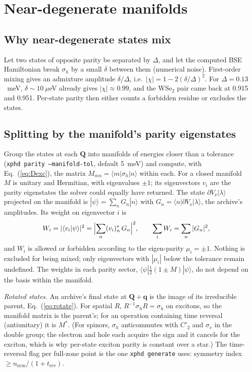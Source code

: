 \documentclass[10pt,a4paper]{article}
\newcommand{\bq}{\mathbf{q}}
\newcommand{\bQ}{\mathbf{Q}}
\begin{document}
\section{Near-degenerate manifolds}
\label{sec:manifold}

\subsection{Why near-degenerate states mix}
Let two states of opposite parity be separated by $\Delta$, and let the computed
BSE Hamiltonian break $\sigma_h$ by a small $\delta$ between them (numerical
noise). First-order mixing gives an admixture amplitude $\delta/\Delta$, i.e.\
$|\chi|=1-2(\delta/\Delta)^2$. For $\Delta=0.13$~meV, $\delta\sim10~\mu$eV
already gives $|\chi|\approx0.99$, and the WSe$_2$ pair came back at 0.915 and
0.951. Per-state parity then either counts a forbidden residue or excludes the
states.

\subsection{Splitting by the manifold's parity eigenstates}
Group the states at each $\bQ$ into manifolds of energies closer than a
tolerance (\texttt{xphd parity --manifold-tol}, default 5~meV) and compute, with
Eq.~(\ref{eq:Dexc}), the matrix $M_{mn}=\langle m|\sigma_h|n\rangle$ within each.
For a closed manifold $M$ is unitary and Hermitian, with eigenvalues $\pm1$;
its eigenvectors $v_i$ are the parity eigenstates the solver could equally have
returned. The state $\partial V_\nu|\lambda\rangle$ projected on the manifold is
$|\psi\rangle=\sum_n G_n|n\rangle$ with $G_n=\langle n|\partial V_\nu|\lambda\rangle$,
the archive's amplitudes. Its weight on eigenvector $i$ is
\begin{equation}
W_i=|\langle v_i|\psi\rangle|^2=\Bigl|\sum_n (v_i)_n^{*}\,G_n\Bigr|^2,
\qquad \sum_iW_i=\sum_n|G_n|^2 ,
\end{equation}
and $W_i$ is allowed or forbidden according to the eigen-parity $\mu_i=\pm1$.
Nothing is excluded for being mixed; only eigenvectors with $|\mu_i|$ below the
tolerance remain undefined. The weights in each parity sector,
$\langle\psi|\tfrac12(1\pm M)|\psi\rangle$, do not depend on the basis within the
manifold.

\emph{Rotated states.} An archive's final state at $\bQ+\bq$ is the image of its
irreducible parent, Eq.~(\ref{eq:rotate}). For spatial $R$,
$R^{-1}\sigma_hR=\sigma_h$ on excitons, so the manifold matrix is the parent's;
for an operation containing time reversal (antiunitary) it is
$M^{*}$. (For spinors, $\sigma_h$ anticommutes with $C'_2$ and $\sigma_v$ in the
double group; the electron and hole each acquire the sign and it cancels for
the exciton, which is why per-state exciton parity is constant over a star.)
The time-reversal flag per full-zone point is the one \texttt{xphd generate}
uses: symmetry index $\ge n_{\mathrm{sym}}/(1+t_{\mathrm{rev}})$.
\end{document}
